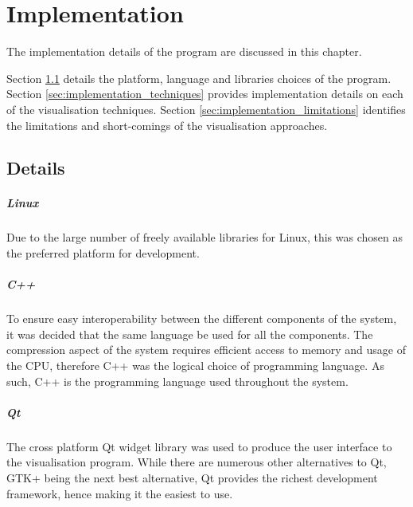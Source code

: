 \graphicspath{{./implementation/}}

\chapter{Implementation}
\label{cha:implementation}

The implementation details of the program are discussed in this chapter.

Section \ref{sec:implementation_details} details the platform, language and
libraries choices of the program. Section \ref{sec:implementation_techniques}
provides implementation details on each of the visualisation techniques.
Section \ref{sec:implementation_limitations} identifies the limitations and
short-comings of the visualisation approaches.

\section{Details}
\label{sec:implementation_details}

\paragraph{Linux}

Due to the large number of freely available libraries for Linux, this was
chosen as the preferred platform for development.


\paragraph{C++}

To ensure easy interoperability between the different components of the system,
it was decided that the same language be used for all the components. The
compression aspect of the system requires efficient access to memory and usage
of the CPU, therefore C++ was the logical choice of programming language. As
such, C++ is the programming language used throughout the system.


\paragraph{Qt}

The cross platform Qt widget library \citep{Qt} was used to produce the user
interface to the visualisation program. While there are numerous other
alternatives to Qt, GTK+ being the next best alternative, Qt provides the
richest development framework, hence making it the easiest to use.

